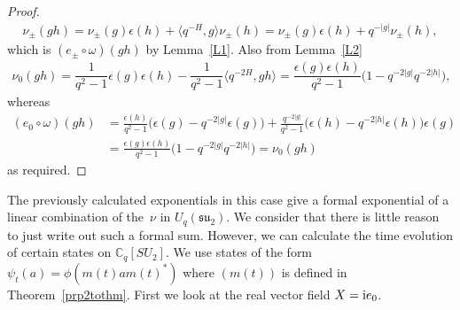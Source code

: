 \documentclass[10pt,a4paper]{amsart}
\numberwithin{equation}{section}
\newcommand{\C}{\mathbb{C}}
\newcommand{\<}{\langle}
\renewcommand{\>}{\rangle}
\begin{document}
\begin{proof}
\begin{gather*}
	\nu_{\pm}(g h)=		\nu_{\pm}(g) \epsilon (h) +\big\langle q^{-H},g\big\rangle \nu_{\pm} (h) =		\nu_{\pm}(g) \epsilon (h) +q^{-|g|} 	\nu_{\pm} (h),
\end{gather*}
which is $ (e_{\pm} \circ \omega)(gh) $ by Lemma~\ref{L1}. Also from Lemma~\ref{L2}
\begin{gather*}
	\nu_{0}(g h)= \dfrac{1}{q^{2}-1}\epsilon (g)\epsilon (h)-\dfrac{1}{q^{2}-1}\big\langle q^{-2H},g h\big\rangle = \dfrac{\epsilon (g)\epsilon (h)}{q^{2}-1}\big(1-q^{-2|g|} q^{-2|h|} \big),
\end{gather*}
whereas
\begin{align*}
	(e_{0} \circ \omega)(g h)&= \frac{\epsilon (h)}{q^{2}-1}\big(\epsilon (g)-q^{-2|g|}\epsilon (g)\big)+ \frac{q^{-2|g|}}{q^{2}-1} \big(\epsilon (h)-q^{-2|h|}\epsilon (h)\big)\epsilon (g)\\
	&= \frac{\epsilon (g)\epsilon (h)}{q^{2}-1}\big(1-q^{-2|g|}q^{-2|h|}\big)=\nu_{0}(g h)
\end{align*}
as required.
\end{proof}

The previously calculated exponentials in this case give a formal exponential of a linear combination of the~$ \nu$ in $U_{q}({\mathfrak{su}}_{2}) $. We consider that there is little reason to just write out such a formal sum. However, we can calculate the time evolution of certain states on $ \C_{q}[SU_{2}] $. We use states of the form $ \psi_t(a)=\phi(m(t) a m(t)^{*}) $ where $ (m(t) )$ is defined in Theorem~\ref{prp2tothm}. First we look at the real vector field $ X= {\rm i} e_{0} $.
\end{document}
